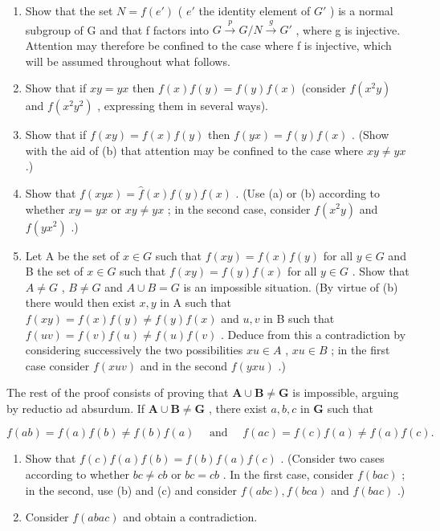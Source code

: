 \begin{enumerate}
\def\labelenumi{(\alph{enumi})}
\item
  Show that the set \(N = f(e')\) ( \(e'\) the identity element of \(G'\) ) is a normal subgroup of G and that f factors into \(G \xrightarrow{p} G/N \xrightarrow{g} G'\) , where g is injective. Attention may therefore be confined to the case where f is injective, which will be assumed throughout what follows.
\item
  Show that if \(xy = yx\) then \(f(x)f(y) = f(y)f(x)\) (consider \(f(x^2y)\) and \(f(x^2y^2)\) , expressing them in several ways).
\item
  Show that if \(f(xy) = f(x)f(y)\) then \(f(yx) = f(y)f(x)\) . (Show with the aid of (b) that attention may be confined to the case where \(xy \neq yx\) .)
\item
  Show that \(f(xyx) = \hat{f}(x)f(y)f(x)\) . (Use (a) or (b) according to whether \(xy = yx\) or \(xy \neq yx\) ; in the second case, consider \(f(x^2y)\) and \(f(yx^2)\) .)
\item
  Let A be the set of \(x \in G\) such that \(f(xy) = f(x)f(y)\) for all \(y \in G\) and B the set of \(x \in G\) such that \(f(xy) = f(y)f(x)\) for all \(y \in G\) . Show that \(A \neq G\) , \(B \neq G\) and \(A \cup B = G\) is an impossible situation. (By virtue of (b) there would then exist \(x, y\) in A such that \(f(xy) = f(x)f(y) \neq f(y)f(x)\) and \(u, v\) in B such that \(f(uv) = f(v)f(u) \neq f(u)f(v)\) . Deduce from this a contradiction by considering successively the two possibilities \(xu \in A\) , \(xu \in B\) ; in the first case consider \(f(xuv)\) and in the second \(f(yxu)\) .)
\end{enumerate}

The rest of the proof consists of proving that \(\mathbf{A} \cup \mathbf{B} \neq \mathbf{G}\) is impossible, arguing by reductio ad absurdum. If \(\mathbf{A} \cup \mathbf{B} \neq \mathbf{G}\) , there exist \(a, b, c\) in \(\mathbf{G}\) such that

\[
f (a b) = f (a) f (b) \neq f (b) f (a) \quad \text { and } \quad f (a c) = f (c) f (a) \neq f (a) f (c).
\]

\begin{enumerate}
\def\labelenumi{(\alph{enumi})}
\setcounter{enumi}{5}
\item
  Show that \(f(c)f(a)f(b) = f(b)f(a)f(c)\) . (Consider two cases according to whether \(bc \neq cb\) or \(bc = cb\) . In the first case, consider \(f(bac)\) ; in the second, use (b) and (c) and consider \(f(abc), f(bca)\) and \(f(bac)\) .)
\item
  Consider \(f(abac)\) and obtain a contradiction.
\end{enumerate}

